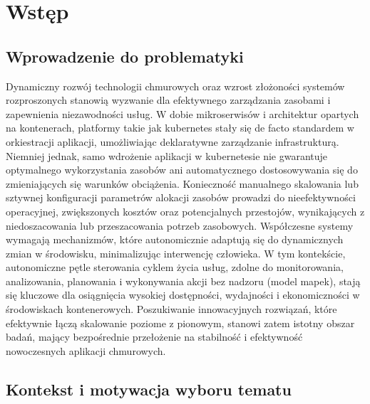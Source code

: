 \newpage

\section{Wstęp}

\subsection{Wprowadzenie do problematyki}

Dynamiczny rozwój technologii chmurowych oraz wzrost złożoności systemów rozproszonych 
stanowią wyzwanie dla efektywnego zarządzania zasobami i zapewnienia niezawodności usług.
W dobie mikroserwisów i architektur opartych na kontenerach, platformy takie jak 
\Gls{kubernetes} stały się de facto standardem w orkiestracji aplikacji, umożliwiając 
deklaratywne zarządzanie infrastrukturą.
Niemniej jednak, samo wdrożenie aplikacji w 
\Gls{kubernetes}ie nie gwarantuje optymalnego wykorzystania zasobów ani automatycznego 
dostosowywania się do zmieniających się warunków obciążenia.
Konieczność manualnego 
skalowania lub sztywnej konfiguracji parametrów alokacji zasobów prowadzi do nieefektywności 
operacyjnej, zwiększonych kosztów oraz potencjalnych przestojów, wynikających z 
niedoszacowania lub przeszacowania potrzeb zasobowych.
Współczesne systemy wymagają 
mechanizmów, które autonomicznie adaptują się do dynamicznych zmian w środowisku, 
minimalizując interwencję człowieka.
W tym kontekście, autonomiczne pętle sterowania 
cyklem życia usług, zdolne do monitorowania, analizowania, planowania i wykonywania 
akcji bez nadzoru (model \Gls{mapek}), stają się kluczowe dla osiągnięcia wysokiej dostępności, wydajności 
i ekonomiczności w środowiskach kontenerowych.
Poszukiwanie innowacyjnych rozwiązań, które 
efektywnie łączą skalowanie poziome z pionowym, stanowi zatem istotny obszar 
badań, mający bezpośrednie przełożenie na stabilność i efektywność nowoczesnych 
aplikacji chmurowych.

\subsection{Kontekst i motywacja wyboru tematu}

